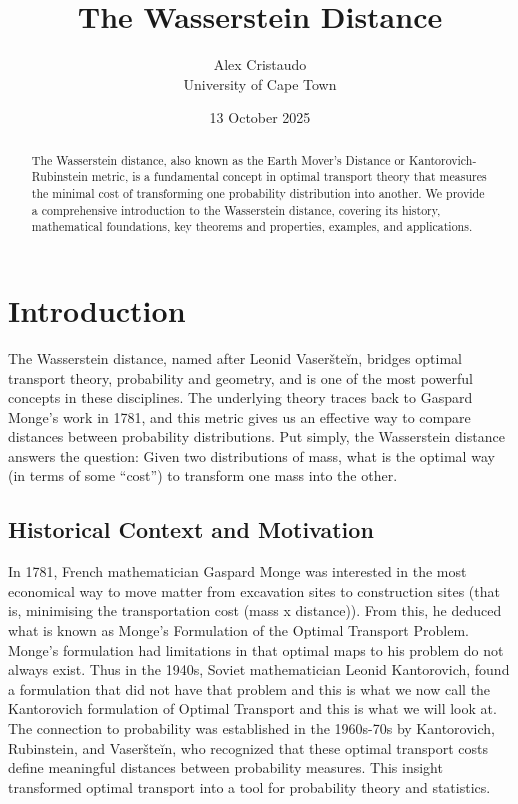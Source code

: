 \documentclass[11pt,a4paper]{article}
\title{\Huge\textbf{The Wasserstein Distance}}
\author{\Large Alex Cristaudo \\ \large University of Cape Town}
\date{13 October 2025}
\theoremstyle{remark}
\begin{document}
\maketitle

\begin{abstract}
The Wasserstein distance, also known as the Earth Mover's Distance or Kantorovich-Rubinstein metric, is a fundamental concept in optimal transport theory that measures the minimal cost of transforming one probability distribution into another. We provide a comprehensive introduction to the Wasserstein distance, covering its history, mathematical foundations, key theorems and properties, examples, and applications. 
\end{abstract}

\section{Introduction}

The Wasserstein distance, named after Leonid Vaseršteĭn, bridges optimal transport theory, probability and geometry, and is one of the most powerful concepts in these disciplines. The underlying theory traces back to Gaspard Monge's work in 1781, and this metric gives us an effective way to compare distances between probability distributions. Put simply, the Wasserstein distance answers the question: Given two distributions of mass, what is the optimal way (in terms of some ``cost'') to transform one mass into the other.




\subsection{Historical Context and Motivation}

In 1781, French mathematician Gaspard Monge was interested in the most economical way to move matter from excavation sites to construction sites (that is, minimising the transportation cost (mass x distance)). From this, he deduced what is known as Monge's Formulation of the Optimal Transport Problem. Monge's formulation had limitations in that optimal maps to his problem do not always exist. Thus in the 1940s, Soviet mathematician Leonid Kantorovich, found a formulation that did not have that problem and this is what we now call the Kantorovich formulation of Optimal Transport and this is what we will look at. The connection to probability was established in the 1960s-70s by Kantorovich, Rubinstein, and Vaseršteĭn, who recognized that these optimal transport costs define meaningful distances between probability measures. This insight transformed optimal transport into a tool for probability theory and statistics.
\end{document}
